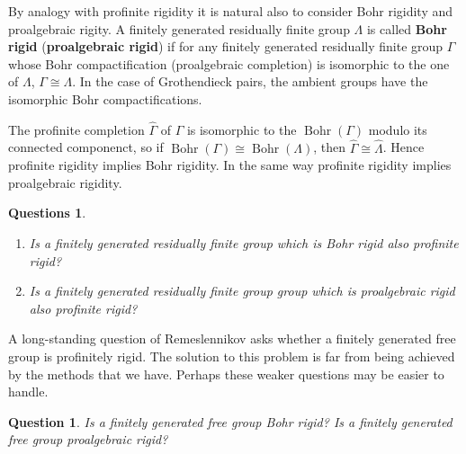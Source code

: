 \documentclass{amsart}
\newtheorem{Question}[Conj]{Question}
\newtheorem{Questions}[Conj]{Questions}
\theoremstyle{definition}
\theoremstyle{remark}
\DeclareMathOperator{\B}{Bohr}
\begin{document}
By analogy with  profinite rigidity it is natural also to consider   Bohr rigidity and  proalgebraic rigity.  A finitely generated residually finite group $\Lambda$ is called {\bf Bohr  rigid} ({\bf proalgebraic rigid})  if for any finitely generated residually finite group $\Gamma$ whose Bohr compactification (proalgebraic completion) is isomorphic to the one of $\Lambda$, $\Gamma\cong \Lambda$.  In the case of Grothendieck pairs, the ambient groups have the isomorphic Bohr compactifications.

The profinite completion $\widehat \Gamma$ of $\Gamma$ is isomorphic to the $\B(\Gamma)$ modulo its connected componenct, so if $\B(\Gamma)\cong \B(\Lambda)$, then $\widehat \Gamma\cong \widehat \Lambda$. Hence   profinite rigidity implies   Bohr rigidity. In the same way profinite rigidity implies proalgebraic rigidity.
\begin{Questions}\
\begin{enumerate}
\item[(a)] Is a finitely generated residually finite  group which is    Bohr rigid also   profinite rigid?
\item[(b)] Is a finitely generated residually finite  group group which is proalgebraic rigid also profinite rigid?
\end{enumerate}
\end{Questions}

A long-standing  question of Remeslennikov asks whether a finitely generated free group is profinitely rigid. The solution to this problem is far from being achieved by the methods that we have. Perhaps these weaker questions may be easier to handle.\begin{Question}
Is a finitely generated free group     Bohr rigid? Is a finitely generated free group     proalgebraic rigid?
\end{Question}
\end{document}
